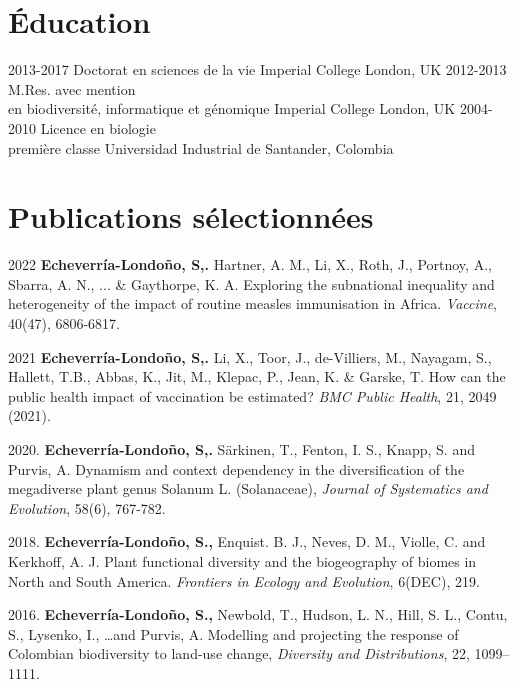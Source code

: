 \documentclass[icon]{twentysecondcv}
\begin{document}
\section{Éducation}

\begin{twenty}
  \twentyitem
    {2013-2017}
    {Doctorat  {\normalfont en sciences de la vie}}
    {Imperial College London, UK}
    {}
  \twentyitem
    {2012-2013}
    {M.Res. avec mention  \\  {\normalfont en biodiversité, informatique et génomique}}
    {Imperial College London, UK}
    {}
  \twentyitem
    {2004-2010}
    {Licence en biologie  \\  première classe}
    {Universidad Industrial de Santander, Colombia}
    {}
 \end{twenty}
 
 
 \section{Publications sélectionnées}

\small 2022 \textbf{Echeverr\'ia-Londo\~no, S,.}  Hartner, A. M., Li, X., Roth, J., Portnoy, A., Sbarra, A. N., ... \& Gaythorpe, K. A. Exploring the subnational inequality and heterogeneity of the impact of routine measles immunisation in Africa. \textit{Vaccine}, 40(47), 6806-6817. 

\small  2021 \textbf{Echeverr\'ia-Londo\~no, S,.}  Li, X., Toor, J., de-Villiers, M., Nayagam, S., Hallett, T.B., Abbas, K., Jit, M., Klepac, P., Jean, K. \&  Garske, T. How can the public health impact of vaccination be estimated? \textit{BMC Public Health}, 21, 2049 (2021).

\small  2020. \textbf{Echeverr\'ia-Londo\~no, S,.}  S{\"a}rkinen, T., Fenton, I. S., Knapp, S. and Purvis, A. Dynamism and context dependency in the diversification of the megadiverse plant genus Solanum L. (Solanaceae), \textit{Journal of Systematics and Evolution},  58(6), 767-782. 

\small  2018. \textbf{Echeverr\'ia-Londo\~no, S.,} Enquist. B. J., Neves, D. M., Violle, C. and Kerkhoff, A. J. Plant functional diversity and the biogeography of biomes in North and South America. \textit{Frontiers in Ecology and Evolution}, 6(DEC), 219.

\small  2016. \textbf{Echeverr\'ia-Londo\~no, S.,} Newbold, T., Hudson, L. N., Hill, S. L., Contu, S., Lysenko, I., \dots and Purvis, A. Modelling and projecting the response of Colombian biodiversity to land-use change, \textit{Diversity and Distributions}, 22, 1099--1111. 
\end{document}
